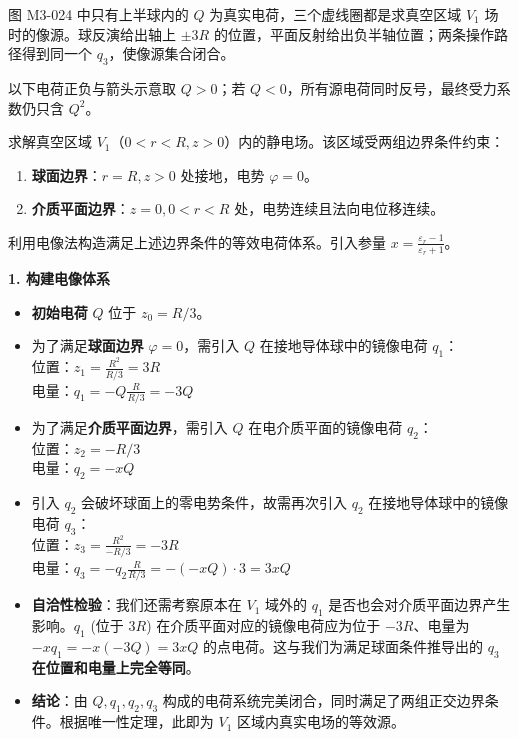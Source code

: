 图 M3-024 中只有上半球内的 \(Q\) 为真实电荷，三个虚线圈都是求真空区域
\(V_1\) 场时的像源。球反演给出轴上 \(\pm3R\)
的位置，平面反射给出负半轴位置；两条操作路径得到同一个
\(q_3\)，使像源集合闭合。

以下电荷正负与箭头示意取 \(Q>0\)；若
\(Q<0\)，所有源电荷同时反号，最终受力系数仍只含 \(Q^2\)。

求解真空区域
\(V_1\)（\(0 < r < R, z > 0\)）内的静电场。该区域受两组边界条件约束：

\begin{enumerate}
\def\labelenumi{\arabic{enumi}.}
\tightlist
\item
  \textbf{球面边界}：\(r=R, z>0\) 处接地，电势 \(\varphi=0\)。
\item
  \textbf{介质平面边界}：\(z=0, 0<r<R\) 处，电势连续且法向电位移连续。
\end{enumerate}

利用电像法构造满足上述边界条件的等效电荷体系。引入参量
\(x = \frac{\varepsilon_r - 1}{\varepsilon_r + 1}\)。

\textbf{1. 构建电像体系}

\begin{itemize}
\tightlist
\item
  \textbf{初始电荷} \textbf{\(Q\)} 位于 \(z_0 = R/3\)。
\item
  为了满足\textbf{球面边界} \textbf{\(\varphi=0\)}，需引入 \(Q\)
  在接地导体球中的镜像电荷 \(q_1\)：\\
  位置：\(z_1 = \frac{R^2}{R/3} = 3R\)\\
  电量：\(q_1 = -Q \frac{R}{R/3} = -3Q\)
\item
  为了满足\textbf{介质平面边界}，需引入 \(Q\) 在电介质平面的镜像电荷
  \(q_2\)：\\
  位置：\(z_2 = -R/3\)\\
  电量：\(q_2 = -xQ\)
\item
  引入 \(q_2\) 会破坏球面上的零电势条件，故需再次引入 \(q_2\)
  在接地导体球中的镜像电荷 \(q_3\)：\\
  位置：\(z_3 = \frac{R^2}{-R/3} = -3R\)\\
  电量：\(q_3 = -q_2 \frac{R}{R/3} = -(-xQ) \cdot 3 = 3xQ\)
\item
  \textbf{自洽性检验}：我们还需考察原本在 \(V_1\) 域外的 \(q_1\)
  是否也会对介质平面边界产生影响。\(q_1\) (位于 \(3R\))
  在介质平面对应的镜像电荷应为位于 \(-3R\)、电量为
  \(-xq_1 = -x(-3Q) = 3xQ\) 的点电荷。这与我们为满足球面条件推导出的
  \(q_3\) \textbf{在位置和电量上完全等同}。
\item
  \textbf{结论}：由 \(Q, q_1, q_2, q_3\)
  构成的电荷系统完美闭合，同时满足了两组正交边界条件。根据唯一性定理，此即为
  \(V_1\) 区域内真实电场的等效源。
\end{itemize}


